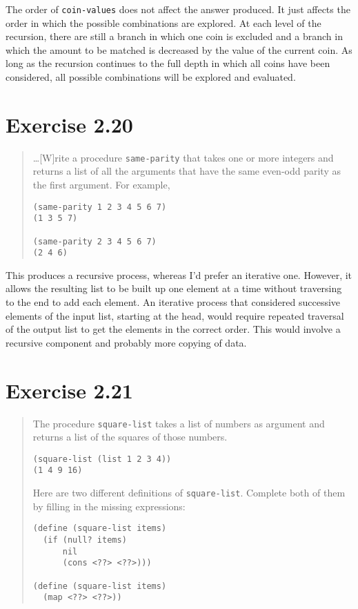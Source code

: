 \documentclass{article}
\begin{document}


The order of \texttt{coin-values} does not affect the answer produced. It just
affects the order in which the possible combinations are explored. At each level
of the recursion, there are still a branch in which one coin is excluded and a
branch in which the amount to be matched is decreased by the value of the
current coin. As long as the recursion continues to the full depth in which all
coins have been considered, all possible combinations will be explored and
evaluated.

\section{Exercise 2.20}
\begin{quote}
    \ldots[W]rite a procedure \texttt{same-parity} that takes one or more
    integers and returns a list of all the arguments that have the same
    even-odd parity as the first argument. For example,
    \begin{lstlisting}
(same-parity 1 2 3 4 5 6 7)
(1 3 5 7)

(same-parity 2 3 4 5 6 7)
(2 4 6)
    \end{lstlisting}
\end{quote}



This produces a recursive process, whereas I'd prefer an iterative one.
However, it allows the resulting list to be built up one element at a time
without traversing to the end to add each element. An iterative process that
considered successive elements of the input list, starting at the head, would
require repeated traversal of the output list to get the elements in the correct
order. This would involve a recursive component and probably more copying of
data.

\section{Exercise 2.21}
\begin{quote}
    The procedure \texttt{square-list} takes a list of numbers as argument and
    returns a list of the squares of those numbers.
    \begin{lstlisting}
(square-list (list 1 2 3 4))
(1 4 9 16)
    \end{lstlisting}
    Here are two different definitions of \texttt{square-list}. Complete both
    of them by filling in the missing expressions:
    \begin{lstlisting}
(define (square-list items)
  (if (null? items)
      nil
      (cons <??> <??>)))

(define (square-list items)
  (map <??> <??>))
    \end{lstlisting}
\end{quote}
\end{document}
